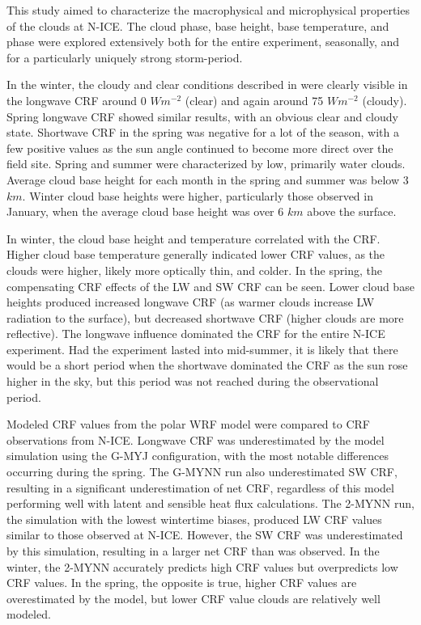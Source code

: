This study aimed to characterize the macrophysical and microphysical properties of the clouds at N-ICE. The cloud phase, base height, base temperature, and phase were explored extensively both for the entire experiment, seasonally, and for a particularly uniquely strong storm-period. 

In the winter, the cloudy and clear conditions described in \citet{graham:2017} were clearly visible in the longwave CRF around 0 $Wm^{-2}$ (clear) and again around 75 $Wm^{-2}$ (cloudy). Spring longwave CRF showed similar results, with an obvious clear and cloudy state. Shortwave CRF in the spring was negative for a lot of the season, with a few positive values as the sun angle continued to become more direct over the field site. Spring and summer were characterized by low, primarily water clouds. Average cloud base height for each month in the spring and summer was below 3 $km$. Winter cloud base heights were higher, particularly those observed in January, when the average cloud base height was over 6 $km$ above the surface.

In winter, the cloud base height and temperature correlated with the CRF. Higher cloud base temperature generally indicated lower CRF values, as the clouds were higher, likely more optically thin, and colder. In the spring, the compensating CRF effects of the LW and SW CRF can be seen. Lower cloud base heights produced increased longwave CRF (as warmer clouds increase LW radiation to the surface), but decreased shortwave CRF (higher clouds are more reflective). The longwave influence dominated the CRF for the entire N-ICE experiment. Had the experiment lasted into mid-summer, it is likely that there would be a short period when the shortwave dominated the CRF as the sun rose higher in the sky, but this period was not reached during the observational period.

Modeled CRF values from the polar WRF model were compared to CRF observations from N-ICE. Longwave CRF was underestimated by the model simulation using the G-MYJ configuration, with the most notable differences occurring during the spring. The G-MYNN run also underestimated SW CRF, resulting in a significant underestimation of net CRF, regardless of this model performing well with latent and sensible heat flux calculations. The 2-MYNN run, the simulation with the lowest wintertime biases, produced LW CRF values similar to those observed at N-ICE. However, the SW CRF was underestimated by this simulation, resulting in a larger net CRF than was observed. In the winter, the 2-MYNN accurately predicts high CRF values but overpredicts low CRF values. In the spring, the opposite is true, higher CRF values are overestimated by the model, but lower CRF value clouds are relatively well modeled.

